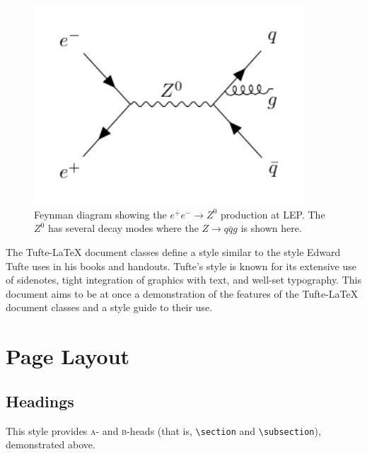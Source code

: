 \documentclass[a4paper, twoside, nobib]{tufte-book}
\newcommand{\TL}{Tufte-\LaTeX\xspace}
\begin{document}
\begin{figure}
  \includegraphics[width=0.9\textwidth]{figures/feynman_diagrams/eeZqqg.pdf}
  \caption[Feynman diagram for the jet production at LEP]{Feynman diagram showing the $e^+ e^- \rightarrow Z^0$ production at LEP. The $Z^0$ has several decay modes where the $Z \rightarrow q\bar{q}g$ is shown here.}
  \label{fig:hep:feynman_3j_qqg}
\end{figure}






The \TL document classes define a style similar to the
style Edward Tufte uses in his books and handouts.  Tufte's style is known
for its extensive use of sidenotes, tight integration of graphics with
text, and well-set typography.  This document aims to be at once a
demonstration of the features of the \TL document classes
and a style guide to their use.

\section{Page Layout}\label{sec:page-layout}
\subsection{Headings}\label{sec:headings}
This style provides \textsc{a}- and \textsc{b}-heads (that is,
\Verb|\section| and \Verb|\subsection|), demonstrated above.
\end{document}
